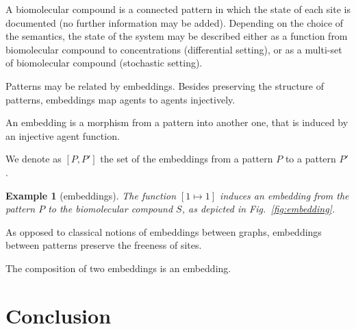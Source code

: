 \documentclass{entcs}
\newtheorem{myexample}[thm]{Example}
\begin{document}
A biomolecular compound is a connected pattern in which the state of each site is documented (no further information may be added). Depending on the choice of the semantics, the state of the system may be described either as a function from biomolecular compound to concentrations (differential setting), or as a multi-set of biomolecular compound  (stochastic setting).

Patterns may be related by embeddings. Besides preserving the structure of patterns, embeddings map agents to agents injectively.

\begin{defn}[embeddings]
  An embedding is a morphism from a pattern into another one, that is induced by an injective agent function.

  We denote as $[P,P']$ the set of the embeddings from a pattern $P$ to a pattern $P'$.
\end{defn}

\begin{myexample}[embeddings]
  The function $[1\mapsto 1]$ induces an embedding from the pattern $P$ to the biomolecular compound $S$, as depicted in Fig.~\ref{fig:embedding}. %
\end{myexample}

As opposed to classical notions of embeddings between graphs, embeddings between patterns preserve the freeness of sites.

The composition of two embeddings is an embedding.

\section{Conclusion}



\end{document}
